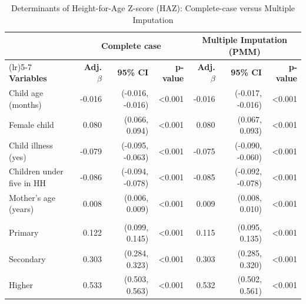 \begin{table}[htbp]
\centering
\caption{Determinants of Height-for-Age Z-score (HAZ): Complete-case versus Multiple Imputation}
\label{tab:cc_mi}
\begin{threeparttable}

\small
\renewcommand{\arraystretch}{1.15}
\setlength{\tabcolsep}{6pt}

\begin{tabularx}{\textwidth}{
>{\raggedright\arraybackslash}X
r r r
r r r}
\toprule
& \multicolumn{3}{c}{\textbf{Complete case}} 
& \multicolumn{3}{c}{\textbf{Multiple Imputation (PMM)}} \\
\cmidrule(lr){2-4} \cmidrule(lr){5-7}
\textbf{Variables} 
& \textbf{Adj. $\beta$} & \textbf{95\% CI} & \textbf{p-value}
& \textbf{Adj. $\beta$} & \textbf{95\% CI} & \textbf{p-value} \\
\midrule

Child age (months) 
& -0.016 & (-0.016, -0.016) & \textless0.001 
& -0.016 & (-0.017, -0.016) & \textless0.001 \\

Female child 
& 0.080 & (0.066, 0.094) & \textless0.001 
& 0.080 & (0.067, 0.093) & \textless0.001 \\

Child illness (yes) 
& -0.079 & (-0.095, -0.063) & \textless0.001 
& -0.075 & (-0.090, -0.060) & \textless0.001 \\

Children under five in HH 
& -0.086 & (-0.094, -0.078) & \textless0.001 
& -0.085 & (-0.092, -0.078) & \textless0.001 \\

Mother's age (years) 
& 0.008 & (0.006, 0.009) & \textless0.001 
& 0.009 & (0.008, 0.010) & \textless0.001 \\

\addlinespace[4pt]
\multicolumn{7}{l}{\textbf{Mother's education (ref: no education)}} \\

Primary 
& 0.122 & (0.099, 0.145) & \textless0.001 
& 0.115 & (0.095, 0.135) & \textless0.001 \\

Secondary 
& 0.303 & (0.284, 0.323) & \textless0.001 
& 0.303 & (0.285, 0.320) & \textless0.001 \\

Higher 
& 0.533 & (0.503, 0.563) & \textless0.001 
& 0.532 & (0.502, 0.561) & \textless0.001 \\


\end{tabularx}
\end{threeparttable}
\end{table}
